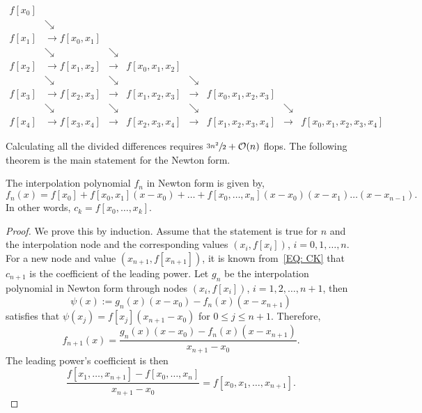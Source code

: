\begin{tcolorbox}
    \begin{equation}\label{EQ: ALG NEWTON}
    \begin{aligned}
        f[x_0] &               &\\ 
               &\searrow       &\\ 
        f[x_1] &\to f[x_0, x_1]& \\
               &\searrow        &\searrow&\\ 
        f[x_2] & \to f[x_1, x_2]&\to& f[x_0, x_1, x_2]\\
               &\searrow        &\searrow& &\searrow&\\ 
        f[x_3] &\to f[x_2, x_3] &\to& f[x_1, x_2, x_3] &\to & f[x_0, x_1, x_2, x_3]\\
               &\searrow        &\searrow & &\searrow&  &\searrow &\\ 
        f[x_4] & \to f[x_3, x_4]&\to& f[x_2, x_3, x_4] &\to & f[x_1, x_2, x_3, x_4] &\to&  f[x_0, x_1, x_2, x_3, x_4] 
    \end{aligned}
\end{equation}
\end{tcolorbox}
Calculating all the divided differences requires $\sfrac{3n^2}{2} +\mathcal O(n)$ flops. The following theorem is the main statement for the Newton form.
\begin{theorem}
\label{Thm: 2-New-for}
    The interpolation polynomial $f_n$ in Newton form is given by, 
    \begin{equation}
        f_n(x) = f[x_0] + f[x_0, x_1](x-x_0) + \dots + f[x_0, \dots, x_n](x - x_0)(x - x_1)\dots (x - x_{n-1}).
    \end{equation}
    In other words, $c_k = f[x_0, \dots, x_k]$.
\end{theorem}
\begin{proof}
    We prove this by induction. Assume that the statement is true for $n$ and the interpolation node and the corresponding values  $(x_i, f[x_i])$, $i=0,1,\dots, n$. For a new node and value $(x_{n+1}, f[x_{n+1}])$, it is known from~\eqref{EQ: CK} that $c_{n+1}$ is the coefficient of the leading power. Let $g_n$ be the interpolation polynomial in Newton form through nodes $(x_i, f[x_i])$, $i=1,2,\dots, n+1$, then 
    $$\psi(x)  := g_n(x)(x - x_0) - f_n(x)(x - x_{n+1})$$
    satisfies that $\psi(x_j) = f[x_j](x_{n+1} - x_0)$ for $0\le j\le {n+1}$. Therefore,
    \begin{equation}
        f_{n+1}(x) = \frac{g_n(x)(x - x_0) - f_n(x)(x - x_{n+1})}{x_{n+1} - x_0}.
    \end{equation}
    The leading power's coefficient is then 
    \begin{equation}
        \frac{f[x_1, \dots, x_{n+1}] - f[x_0, \dots, x_n]}{x_{n+1} - x_0} = f[x_0, x_1,\dots, x_{n+1}].
    \end{equation}
\end{proof}
